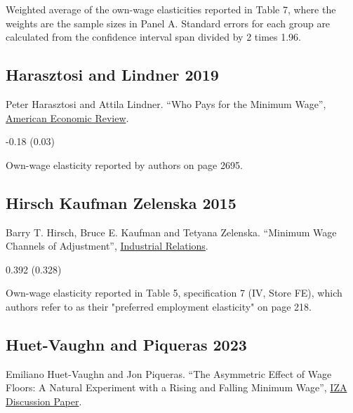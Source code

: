  Weighted average of the own-wage elasticities reported in Table 7, where the weights are the sample sizes in Panel A. Standard errors for each group are calculated from the confidence interval span divided by 2 times 1.96.

\subsection*{Harasztosi and Lindner 2019}
\vspace{-0.7em}

\noindent Peter Harasztosi and Attila Lindner. ``Who Pays for the Minimum Wage'', \href{https://doi.org/10.1257/aer.20171445}{American Economic Review}.

\vspace{0.7em}

 -0.18 (0.03)

\vspace{0.7em}

 Own-wage elasticity reported by authors on page 2695.

\subsection*{Hirsch Kaufman Zelenska 2015}
\vspace{-0.7em}

\noindent Barry T. Hirsch, Bruce E. Kaufman and Tetyana Zelenska. ``Minimum Wage Channels of Adjustment'', \href{https://doi.org/10.1111/irel.12091}{Industrial Relations}.

\vspace{0.7em}

 0.392 (0.328)

\vspace{0.7em}

 Own-wage elasticity reported in Table 5, specification 7 (IV, Store FE), which authors refer to as their "preferred employment elasticity" on page 218.

\subsection*{Huet-Vaughn and Piqueras 2023}
\vspace{-0.7em}

\noindent Emiliano Huet-Vaughn and Jon Piqueras. ``The Asymmetric Effect of Wage Floors: A Natural Experiment with a Rising and Falling Minimum Wage'', \href{https://docs.iza.org/dp16684.pdf}{IZA Discussion Paper}.


